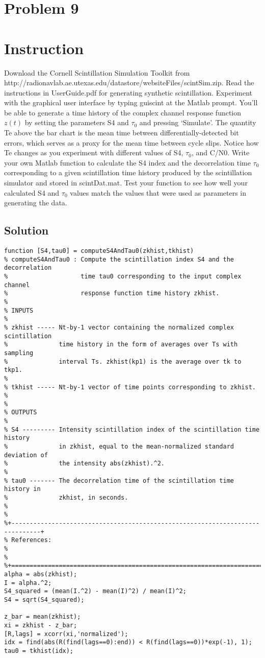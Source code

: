 \section{Problem 9}

\section{Instruction}

Download the Cornell Scintillation Simulation Toolkit from
http://radionavlab.ae.utexas.edu/datastore/websiteFiles/scintSim.zip.
Read the instructions in UserGuide.pdf for generating synthetic scintillation.
Experiment with the graphical user interface by typing guiscint at the Matlab
prompt. You’ll be able to generate a time history of the complex channel
response function $z(t)$ by setting the parameters S4 and $\tau_0$ and pressing
‘Simulate’. The quantity Te above the bar chart is the mean time between
differentially-detected bit errors, which serves as a proxy for the mean time
between cycle slips. Notice how Te changes as you experiment with different
values of S4, $\tau_0$, and C/N0. Write your own Matlab function to calculate
the S4 index and the decorrelation time $\tau_0$ corresponding to a given
scintillation time history produced by the scintillation simulator and stored in
scintDat.mat. Test your function to see how well your calculated S4 and $\tau_0$
values match the values that were used as parameters in generating the data.

\subsection{Solution}


\begin{lstlisting}
function [S4,tau0] = computeS4AndTau0(zkhist,tkhist)
% computeS4AndTau0 : Compute the scintillation index S4 and the decorrelation
%                    time tau0 corresponding to the input complex channel
%                    response function time history zkhist.
%
% INPUTS
%
% zkhist ----- Nt-by-1 vector containing the normalized complex scintillation
%              time history in the form of averages over Ts with sampling
%              interval Ts. zkhist(kp1) is the average over tk to tkp1.
%
% tkhist ----- Nt-by-1 vector of time points corresponding to zkhist.
%
%
% OUTPUTS
%
% S4 --------- Intensity scintillation index of the scintillation time history
%              in zkhist, equal to the mean-normalized standard deviation of
%              the intensity abs(zkhist).^2.
%
% tau0 ------- The decorrelation time of the scintillation time history in
%              zkhist, in seconds.
%
%
%+------------------------------------------------------------------------------+
% References:
%
%
%+==============================================================================+
alpha = abs(zkhist);
I = alpha.^2;
S4_squared = (mean(I.^2) - mean(I)^2) / mean(I)^2;
S4 = sqrt(S4_squared);

z_bar = mean(zkhist);
xi = zkhist - z_bar;
[R,lags] = xcorr(xi,'normalized'); 
idx = find(abs(R(find(lags==0):end)) < R(find(lags==0))*exp(-1), 1);
tau0 = tkhist(idx);
\end{lstlisting}
